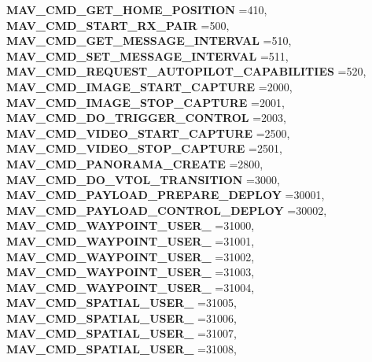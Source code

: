 \begin{DoxyCompactItemize}
\textbf{ M\+A\+V\+\_\+\+C\+M\+D\+\_\+\+G\+E\+T\+\_\+\+H\+O\+M\+E\+\_\+\+P\+O\+S\+I\+T\+I\+ON} =410, 
\newline
\textbf{ M\+A\+V\+\_\+\+C\+M\+D\+\_\+\+S\+T\+A\+R\+T\+\_\+\+R\+X\+\_\+\+P\+A\+IR} =500, 
\textbf{ M\+A\+V\+\_\+\+C\+M\+D\+\_\+\+G\+E\+T\+\_\+\+M\+E\+S\+S\+A\+G\+E\+\_\+\+I\+N\+T\+E\+R\+V\+AL} =510, 
\textbf{ M\+A\+V\+\_\+\+C\+M\+D\+\_\+\+S\+E\+T\+\_\+\+M\+E\+S\+S\+A\+G\+E\+\_\+\+I\+N\+T\+E\+R\+V\+AL} =511, 
\textbf{ M\+A\+V\+\_\+\+C\+M\+D\+\_\+\+R\+E\+Q\+U\+E\+S\+T\+\_\+\+A\+U\+T\+O\+P\+I\+L\+O\+T\+\_\+\+C\+A\+P\+A\+B\+I\+L\+I\+T\+I\+ES} =520, 
\newline
\textbf{ M\+A\+V\+\_\+\+C\+M\+D\+\_\+\+I\+M\+A\+G\+E\+\_\+\+S\+T\+A\+R\+T\+\_\+\+C\+A\+P\+T\+U\+RE} =2000, 
\textbf{ M\+A\+V\+\_\+\+C\+M\+D\+\_\+\+I\+M\+A\+G\+E\+\_\+\+S\+T\+O\+P\+\_\+\+C\+A\+P\+T\+U\+RE} =2001, 
\textbf{ M\+A\+V\+\_\+\+C\+M\+D\+\_\+\+D\+O\+\_\+\+T\+R\+I\+G\+G\+E\+R\+\_\+\+C\+O\+N\+T\+R\+OL} =2003, 
\textbf{ M\+A\+V\+\_\+\+C\+M\+D\+\_\+\+V\+I\+D\+E\+O\+\_\+\+S\+T\+A\+R\+T\+\_\+\+C\+A\+P\+T\+U\+RE} =2500, 
\newline
\textbf{ M\+A\+V\+\_\+\+C\+M\+D\+\_\+\+V\+I\+D\+E\+O\+\_\+\+S\+T\+O\+P\+\_\+\+C\+A\+P\+T\+U\+RE} =2501, 
\textbf{ M\+A\+V\+\_\+\+C\+M\+D\+\_\+\+P\+A\+N\+O\+R\+A\+M\+A\+\_\+\+C\+R\+E\+A\+TE} =2800, 
\textbf{ M\+A\+V\+\_\+\+C\+M\+D\+\_\+\+D\+O\+\_\+\+V\+T\+O\+L\+\_\+\+T\+R\+A\+N\+S\+I\+T\+I\+ON} =3000, 
\textbf{ M\+A\+V\+\_\+\+C\+M\+D\+\_\+\+P\+A\+Y\+L\+O\+A\+D\+\_\+\+P\+R\+E\+P\+A\+R\+E\+\_\+\+D\+E\+P\+L\+OY} =30001, 
\newline
\textbf{ M\+A\+V\+\_\+\+C\+M\+D\+\_\+\+P\+A\+Y\+L\+O\+A\+D\+\_\+\+C\+O\+N\+T\+R\+O\+L\+\_\+\+D\+E\+P\+L\+OY} =30002, 
\textbf{ M\+A\+V\+\_\+\+C\+M\+D\+\_\+\+W\+A\+Y\+P\+O\+I\+N\+T\+\_\+\+U\+S\+E\+R\+\_} =31000, 
\textbf{ M\+A\+V\+\_\+\+C\+M\+D\+\_\+\+W\+A\+Y\+P\+O\+I\+N\+T\+\_\+\+U\+S\+E\+R\+\_} =31001, 
\textbf{ M\+A\+V\+\_\+\+C\+M\+D\+\_\+\+W\+A\+Y\+P\+O\+I\+N\+T\+\_\+\+U\+S\+E\+R\+\_} =31002, 
\newline
\textbf{ M\+A\+V\+\_\+\+C\+M\+D\+\_\+\+W\+A\+Y\+P\+O\+I\+N\+T\+\_\+\+U\+S\+E\+R\+\_} =31003, 
\textbf{ M\+A\+V\+\_\+\+C\+M\+D\+\_\+\+W\+A\+Y\+P\+O\+I\+N\+T\+\_\+\+U\+S\+E\+R\+\_} =31004, 
\textbf{ M\+A\+V\+\_\+\+C\+M\+D\+\_\+\+S\+P\+A\+T\+I\+A\+L\+\_\+\+U\+S\+E\+R\+\_} =31005, 
\textbf{ M\+A\+V\+\_\+\+C\+M\+D\+\_\+\+S\+P\+A\+T\+I\+A\+L\+\_\+\+U\+S\+E\+R\+\_} =31006, 
\newline
\textbf{ M\+A\+V\+\_\+\+C\+M\+D\+\_\+\+S\+P\+A\+T\+I\+A\+L\+\_\+\+U\+S\+E\+R\+\_} =31007, 
\textbf{ M\+A\+V\+\_\+\+C\+M\+D\+\_\+\+S\+P\+A\+T\+I\+A\+L\+\_\+\+U\+S\+E\+R\+\_} =31008, 

\end{DoxyCompactItemize}
